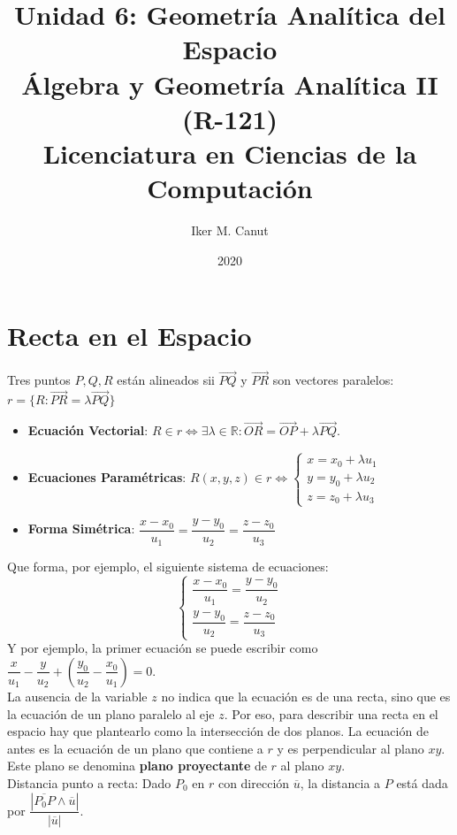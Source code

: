 \documentclass[11pt,a4paper]{article}
\author{Iker M. Canut}
\title{Unidad 6: Geometr\'ia Anal\'itica del Espacio\\ \'Algebra y Geometr\'ia Anal\'itica II (R-121)\\Licenciatura en Ciencias de la Computaci\'on}
\date{2020}
\begin{document}
\maketitle
\newpage

\section{Recta en el Espacio}
Tres puntos $P, Q, R$ est\'an alineados sii $\overrightarrow{PQ}$ y $\overrightarrow{PR}$ son vectores paralelos: $r = \{ R : \overrightarrow{PR} = \lambda \overrightarrow{PQ} \}$
\begin{itemize}
\itemsep-0.3em
\item \textbf{Ecuaci\'on Vectorial}: $R \in r \iff \exists \lambda \in \mathbb{R} : \overrightarrow{OR} = \overrightarrow{OP} + \lambda \overrightarrow{PQ}$.
\item \textbf{Ecuaciones Param\'etricas}: $R(x,y,z) \in r \iff \left\{ \begin{array}{l} x = x_0 + \lambda u_1 \\ y = y_0 + \lambda u_2 \\ z = z_0 + \lambda u_3\end{array} \right.$
\item \textbf{Forma Sim\'etrica}: $\dfrac{x-x_0}{u_1} = \dfrac{y-y_0}{u_2} = \dfrac{z-z_0}{u_3}$
\end{itemize}

Que forma, por ejemplo, el siguiente sistema de ecuaciones:
$$\left\{ \begin{array}{l} \dfrac{x-x_0}{u_1} = \dfrac{y-y_0}{u_2} \\ \dfrac{y-y_0}{u_2} = \dfrac{z-z_0}{u_3} \end{array} \right.$$
Y por ejemplo, la primer ecuaci\'on se puede escribir como $\dfrac{x}{u_1} - \dfrac{y}{u_2} + \left(\dfrac{y_0}{u_2} - \dfrac{x_0}{u_1}\right) = 0$.\\

La ausencia de la variable $z$ no indica que la ecuaci\'on es de una recta, sino que es la ecuaci\'on de un plano paralelo al eje $z$. Por eso, para describir una recta en el espacio hay que plantearlo como la intersecci\'on de dos planos. La ecuaci\'on de antes es la ecuaci\'on de un plano que contiene a $r$ y es perpendicular al plano $xy$. Este plano se denomina \textbf{plano proyectante} de $r$ al plano $xy$.\\

Distancia punto a recta: Dado $P_0$ en $r$ con direcci\'on $\overline{u}$, la distancia a $P$ est\'a dada por $\dfrac{|\overline{P_0P} \wedge \overline{u}|}{|\overline{u}|}$.
\end{document}
